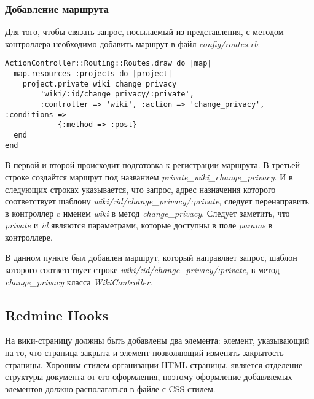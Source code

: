 \subsubsection{Добавление маршрута}
Для того, чтобы связать запрос, посылаемый из представления, с методом
контроллера необходимо добавить маршрут в файл \textit{config/routes.rb}:
\small{\begin{lstlisting}
ActionController::Routing::Routes.draw do |map|
  map.resources :projects do |project|
    project.private_wiki_change_privacy
        'wiki/:id/change_privacy/:private',
        :controller => 'wiki', :action => 'change_privacy',  :conditions =>
            {:method => :post}
  end
end
\end{lstlisting}}
В первой и второй происходит подготовка к регистрации маршрута. В третьей
строке создаётся маршрут под названием \textit{private\_wiki\_change\_privacy}.
И в следующих строках указывается, что запрос, адрес назначения которого
соответствует шаблону \textit{wiki/:id/change\_privacy/:private}, следует
перенаправить в контроллер c именем \textit{wiki} в метод
\textit{change\_privacy}. Следует заметить, что \textit{private} и \textit{id}
являются параметрами, которые доступны в поле \textit{params} в контроллере.

В данном пункте был добавлен маршрут, который направляет запрос, шаблон
которого соответствует строке \textit{wiki/:id/change\_privacy/:private}, в
метод \textit{change\_privacy} класса \textit{WikiController}.


\subsection{Redmine Hooks}
\label{section:redmine_hooks}
На вики-страницу должны быть добавлены два элемента: элемент, указывающий на
то, что страница закрыта и элемент позволяющий изменять закрытость страницы.
Хорошим стилем организации HTML страницы, является отделение структуры
документа от его оформления, поэтому оформление добавляемых элементов должно
располагаться в файле с CSS стилем.


